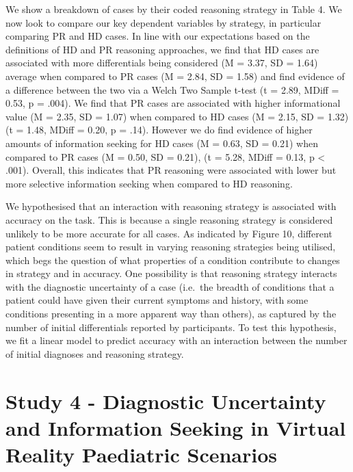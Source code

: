 \documentclass[a4paper, nobind]{templates/ociamthesis}
\begin{document}
We show a breakdown of cases by their coded reasoning strategy in Table 4. We now look to compare our key dependent variables by strategy, in particular comparing PR and HD cases. In line with our expectations based on the definitions of HD and PR reasoning approaches, we find that HD cases are associated with more differentials being considered (M = 3.37, SD = 1.64) average when compared to PR cases (M = 2.84, SD = 1.58) and find evidence of a difference between the two via a Welch Two Sample t-test (t = 2.89, MDiff = 0.53, p = .004). We find that PR cases are associated with higher informational value (M = 2.35, SD = 1.07) when compared to HD cases (M = 2.15, SD = 1.32) (t = 1.48, MDiff = 0.20, p = .14). However we do find evidence of higher amounts of information seeking for HD cases (M = 0.63, SD = 0.21) when compared to PR cases (M = 0.50, SD = 0.21), (t = 5.28, MDiff = 0.13, p \textless{} .001). Overall, this indicates that PR reasoning were associated with lower but more selective information seeking when compared to HD reasoning.

We hypothesised that an interaction with reasoning strategy is associated with accuracy on the task. This is because a single reasoning strategy is considered unlikely to be more accurate for all cases. As indicated by Figure 10, different patient conditions seem to result in varying reasoning strategies being utilised, which begs the question of what properties of a condition contribute to changes in strategy and in accuracy. One possibility is that reasoning strategy interacts with the diagnostic uncertainty of a case (i.e.~the breadth of conditions that a patient could have given their current symptoms and history, with some conditions presenting in a more apparent way than others), as captured by the number of initial differentials reported by participants. To test this hypothesis, we fit a linear model to predict accuracy with an interaction between the number of initial diagnoses and reasoning strategy.

\hypertarget{study-4---diagnostic-uncertainty-and-information-seeking-in-virtual-reality-paediatric-scenarios}{%
\chapter*{Study 4 - Diagnostic Uncertainty and Information Seeking in Virtual Reality Paediatric Scenarios}\label{study-4---diagnostic-uncertainty-and-information-seeking-in-virtual-reality-paediatric-scenarios}}
\end{document}
